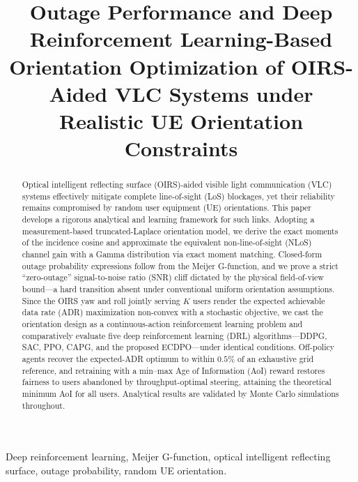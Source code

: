 \documentclass[conference]{IEEEtran}
\begin{document}
\title{Outage Performance and Deep Reinforcement Learning-Based Orientation
Optimization of OIRS-Aided VLC Systems under Realistic UE Orientation
Constraints}

\maketitle

\begin{abstract}
Optical intelligent reflecting surface (OIRS)-aided visible light
communication (VLC) systems effectively mitigate complete line-of-sight (LoS)
blockages, yet their reliability remains compromised by random user equipment
(UE) orientations. This paper develops a rigorous analytical and learning
framework for such links. Adopting a measurement-based truncated-Laplace
orientation model, we derive the exact moments of the incidence cosine and
approximate the equivalent non-line-of-sight (NLoS) channel gain with a Gamma
distribution via exact moment matching. Closed-form outage probability
expressions follow from the Meijer G-function, and we prove a strict
``zero-outage'' signal-to-noise ratio (SNR) cliff dictated by the physical
field-of-view bound---a hard transition absent under conventional uniform
orientation assumptions. Since the OIRS yaw and roll jointly serving $K$ users
render the expected achievable data rate (ADR) maximization non-convex with a
stochastic objective, we cast the orientation design as a continuous-action
reinforcement learning problem and comparatively evaluate five deep
reinforcement learning (DRL) algorithms---DDPG, SAC, PPO, CAPG, and the
proposed ECDPO---under identical conditions. Off-policy agents recover the
expected-ADR optimum to within $0.5\%$ of an exhaustive grid reference, and
retraining with a min--max Age of Information (AoI) reward restores fairness
to users abandoned by throughput-optimal steering, attaining the theoretical
minimum AoI for all users. Analytical results are validated by Monte Carlo
simulations throughout.
\end{abstract}

\begin{IEEEkeywords}
Deep reinforcement learning, Meijer G-function, optical intelligent
reflecting surface, outage probability, random UE orientation.
\end{IEEEkeywords}
\end{document}

